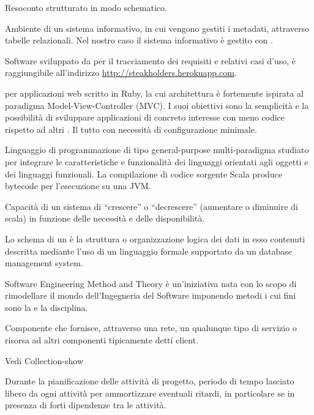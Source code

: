 
Resoconto strutturato in modo schematico.

Ambiente di un sistema informativo, in cui vengono gestiti i metadati, attraverso tabelle relazionali.
Nel nostro caso il sistema informativo è gestito con .

Software sviluppato da \GroupName{} per il tracciamento dei requisiti e relativi casi d'uso, è raggiungibile all'indirizzo \url{http://steakholders.herokuapp.com}.

  per applicazioni web scritto in Ruby, la cui architettura è fortemente ispirata al paradigma Model-View-Controller (MVC). I suoi obiettivi sono la semplicità e la possibilità di sviluppare applicazioni di concreto interesse con meno codice rispetto ad altri . Il tutto con necessità di configurazione minimale.


Linguaggio di programmazione di tipo general-purpose multi-paradigma studiato per integrare le caratteristiche e funzionalità dei linguaggi orientati agli oggetti e dei linguaggi funzionali. La compilazione di codice sorgente Scala produce  bytecode per l'esecuzione su una JVM.

Capacità di un sistema di ``crescere'' o ``decrescere'' (aumentare o diminuire di scala) in funzione delle necessità e delle disponibilità.

Lo schema di un  è la struttura o organizzazione logica dei dati in esso contenuti descritta mediante l'uso di un linguaggio formale supportato da un database management system.

Software Engineering Method and Theory è un'iniziativa nata con lo scopo di rimodellare il mondo dell'Ingegneria del Software imponendo metodi i cui fini sono la  e la disciplina.

Componente che fornisce, attraverso una rete, un qualunque tipo di servizio o risorsa ad altri componenti tipicamente detti client.

Vedi Collection-show

Durante la pianificazione delle attività di progetto, periodo di tempo lasciato libero da ogni attività per ammortizzare eventuali ritardi, in particolare se in presenza di forti dipendenze tra le attività.

